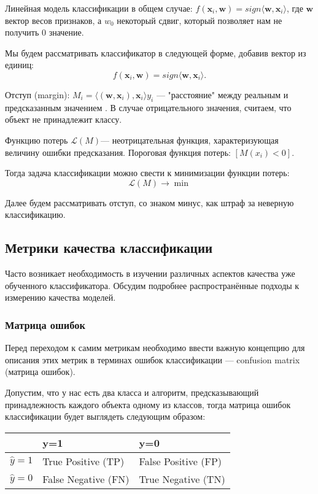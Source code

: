 \documentclass{article}
\begin{document}
Линейная модель классификации в общем случае:
$f(\boldsymbol{x}_i,\boldsymbol{w})=sign\langle\boldsymbol{w},\boldsymbol{x}_i\rangle$, где $\boldsymbol{w}$ вектор весов признаков, а $w_0$ некоторый сдвиг, который позволяет нам не получить 0 значение.


Мы будем рассматривать классификатор в следующей форме, добавив вектор из единиц:
$$f(\boldsymbol{x}_i,\boldsymbol{w})=sign\langle\boldsymbol{w},\boldsymbol{x}_i\rangle.$$

Отступ (margin): $M_i=\langle (\boldsymbol{w}, \boldsymbol{x}_i),\boldsymbol{x}_i\rangle y_i$ ---  "расстояние" между реальным и предсказанным значением . В случае отрицательного значения, считаем, что объект не принадлежит классу. 

Функцию потерь $\mathcal{L}(M)$--- неотрицательная функция, характеризующая величину ошибки предсказания. Пороговая функция потерь: $[M(x_i)<0]$.

Тогда задача классификации можно свести к минимизации функции потерь:
$$\mathcal{L}(M)\to \min$$

Далее будем рассматривать отступ,  со знаком минус, как штраф за неверную классификацию.


\begin{figure}[h!]
\end{figure}

	\subsection{Метрики качества классификации}
	Часто возникает необходимость в изучении различных аспектов качества уже обученного классификатора.
	Обсудим подробнее распространённые подходы к измерению качества моделей.
	\subsubsection{Матрица ошибок}
	
	Перед переходом к самим метрикам необходимо ввести важную концепцию для описания этих метрик в терминах ошибок классификации — confusion matrix (матрица ошибок).
	
	Допустим, что у нас есть два класса и алгоритм, предсказывающий принадлежность каждого объекта одному из классов, тогда матрица ошибок классификации будет выглядеть следующим образом:
	
	\begin{table}[hhh]
		\begin{tabular}{|l|l|l|}
			\hline
			& y=1                 & y=0                 \\ \hline
			$\hat y = 1$ & True Positive (TP)  & False Positive (FP) \\ \hline
			$\hat y = 0$ & False Negative (FN) & True Negative (TN) \\ \hline
		\end{tabular}
	\end{table}
\end{document}
